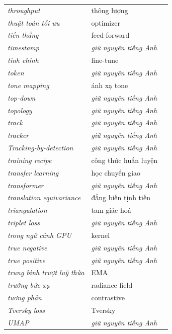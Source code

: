 \documentclass[deep_learning.tex]{subfiles}
\begin{document}
\begin{longtable}{@{}L{5.2cm}L{5.9cm}L{2.6cm}@{}}
\emph{throughput} & thông lượng & \\
\emph{thuật toán tối ưu} & optimizer & \\
\emph{tiến thẳng} & feed-forward & \\
\emph{timestamp} & \emph{\color{tiercol}giữ nguyên tiếng Anh} & \\
\emph{tinh chỉnh} & fine-tune & \\
\emph{token} & \emph{\color{tiercol}giữ nguyên tiếng Anh} & \\
\emph{tone mapping} & ánh xạ tone & \\
\emph{top-down} & \emph{\color{tiercol}giữ nguyên tiếng Anh} & \\
\emph{topology} & \emph{\color{tiercol}giữ nguyên tiếng Anh} & \\
\emph{track} & \emph{\color{tiercol}giữ nguyên tiếng Anh} & \\
\emph{tracker} & \emph{\color{tiercol}giữ nguyên tiếng Anh} & \\
\emph{Tracking-by-detection} & \emph{\color{tiercol}giữ nguyên tiếng Anh} & \\
\emph{training recipe} & công thức huấn luyện & \\
\emph{transfer learning} & học chuyển giao & \\
\emph{transformer} & \emph{\color{tiercol}giữ nguyên tiếng Anh} & \\
\emph{translation equivariance} & đẳng biến tịnh tiến & \\
\emph{triangulation} & tam giác hoá & \\
\emph{triplet loss} & \emph{\color{tiercol}giữ nguyên tiếng Anh} & \\
\emph{trong ngữ cảnh GPU} & kernel & \\
\emph{true negative} & \emph{\color{tiercol}giữ nguyên tiếng Anh} & \\
\emph{true positive} & \emph{\color{tiercol}giữ nguyên tiếng Anh} & \\
\emph{trung bình trượt luỹ thừa} & EMA & \\
\emph{trường bức xạ} & radiance field & \\
\emph{tương phản} & contrastive & \\
\emph{Tversky loss} & Tversky & \\
\emph{UMAP} & \emph{\color{tiercol}giữ nguyên tiếng Anh} & \\

\end{longtable}
\end{document}
